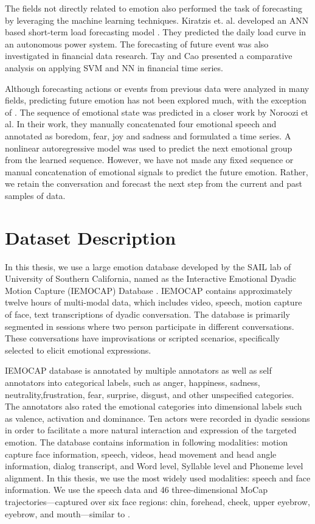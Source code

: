 The fields not directly related to emotion also performed the task of forecasting by leveraging the machine learning techniques. Kiratzis et. al. developed an ANN based short-term load forecasting model \cite{loadForecast}. They predicted the daily load curve in an autonomous power system. The forecasting of future event was also investigated in financial data research. Tay and Cao presented a comparative analysis on applying SVM and NN in financial time series. 

Although forecasting actions or events from previous data were analyzed in many fields, predicting future emotion has not been explored much, with the exception of \cite{norozi}. The sequence of emotional state was predicted in a closer work by Noroozi et al. In their work, they manually concatenated four emotional speech and annotated as boredom, fear, joy and sadness and formulated a time series. A nonlinear autoregressive model was used to predict the next emotional group from the learned sequence. However, we have not made any fixed sequence or manual concatenation of emotional signals to predict the future emotion. Rather, we retain the conversation and forecast the next step from the current and past samples of data. 




\chapter{Dataset Description}
\label{Dataset}

In this thesis, we use a large emotion database developed by the SAIL lab of University of Southern California, named as the Interactive Emotional Dyadic Motion Capture (IEMOCAP) Database \cite{IEMOCAP}. IEMOCAP contains approximately twelve hours of multi-modal data, which includes video, speech, motion capture of face, text transcriptions of dyadic conversation. The database is primarily segmented in sessions where two person participate in different conversations. These conversations have improvisations or scripted scenarios, specifically selected to elicit emotional expressions.

IEMOCAP database is annotated by multiple annotators as well as self annotators into categorical labels, such as anger, happiness, sadness, neutrality,frustration, fear, surprise, disgust, and other unspecified categories. The annotators also rated the emotional categories into dimensional labels such as valence, activation and dominance. Ten actors were recorded in dyadic sessions in order to facilitate a more natural interaction and expression of the targeted emotion.  The database contains information in following modalities: motion capture face information, speech, videos, head movement and head angle information, dialog transcript, and Word level, Syllable level and Phoneme level alignment. In this thesis, we use the most widely used modalities: speech and face information. We use the speech data and 46  three-dimensional MoCap trajectories---captured over six face regions: chin, forehead, cheek, upper eyebrow, eyebrow, and mouth---similar to \cite{Meta}.


